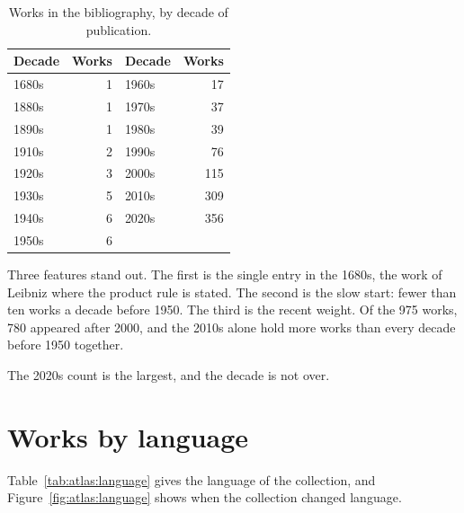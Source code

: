 \begin{table}[htbp]
  \centering
  \caption{Works in the bibliography, by decade of publication.}
  \label{tab:atlas:decades}
  \begin{tabular}{lr@{\qquad}lr}
    \toprule
    Decade & Works & Decade & Works \\ %
    \midrule
    1680s & 1     & 1960s & 17 \\
    1880s & 1     & 1970s & 37 \\
    1890s & 1     & 1980s & 39 \\
    1910s & 2     & 1990s & 76 \\
    1920s & 3     & 2000s & 115 \\
    1930s & 5     & 2010s & 309 \\
    1940s & 6     & 2020s & 356 \\
    1950s & 6     &       &     \\
    \bottomrule
  \end{tabular}
\end{table}

Three features stand out. %
The first is the single entry in the 1680s, the work of Leibniz where the %
product rule is stated. %
The second is the slow start: fewer than ten works a decade before 1950. %
The third is the recent weight. %
Of the 975 works, 780 appeared after 2000, and the 2010s alone hold more %
works than every decade before 1950 together. %

The 2020s count is the largest, and the decade is not over. %

\section{Works by language}

Table~\ref{tab:atlas:language} gives the language of the collection, and %
Figure~\ref{fig:atlas:language} shows when the collection changed language. %

